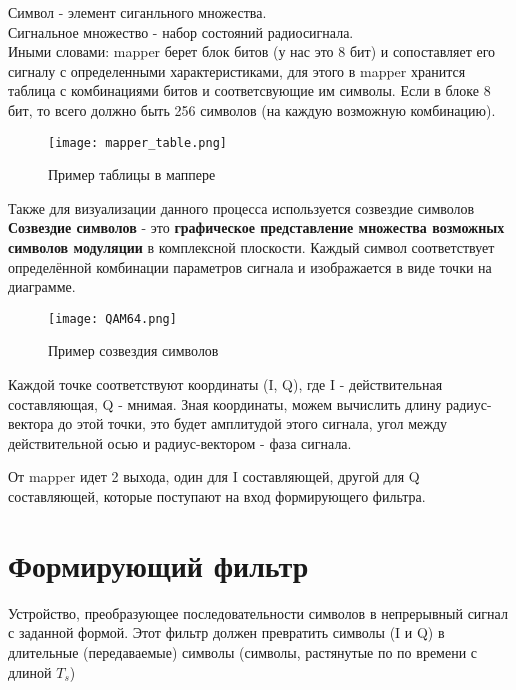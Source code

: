 \medskip

Символ - элемент сиганльного множества. \\

Сигнальное множество - набор состояний радиосигнала. \\

Иными словами: mapper берет блок битов (у нас это 8 бит) и сопоставляет его сигналу с определенными характеристиками, для 
этого в mapper хранится таблица с комбинациями битов и соответсвующие им символы. Если в блоке
8 бит, то всего должно быть 256 символов (на каждую возможную комбинацию). \\

\begin{figure}[H]
    \centering
    \texttt{[image: mapper\_table.png]}
    \caption{Пример таблицы в маппере}
\end{figure}

Также для визуализации данного процесса используется созвездие символов \\

\textbf{Созвездие символов} - это \textbf{графическое представление множества возможных символов модуляции} в комплексной плоскости.  
Каждый символ соответствует определённой комбинации параметров сигнала и изображается в виде точки на диаграмме.  

\begin{figure}[H]
    \centering
    \texttt{[image: QAM64.png]}
    \caption{Пример созвездия символов}
\end{figure}

Каждой точке соответствуют координаты (I, Q), где I - действительная составляющая, Q - мнимая. Зная координаты, можем вычислить
длину радиус-вектора до этой точки, это будет амплитудой этого сигнала, угол между действительной осью и радиус-вектором - фаза
сигнала.

От mapper идет 2 выхода, один для I составляющей, другой для Q составляющей, которые поступают на вход формирующего фильтра.

\section*{Формирующий фильтр}

Устройство, преобразующее последовательности символов в непрерывный сигнал с заданной формой. Этот фильтр должен превратить символы (I и Q) в длительные (передаваемые) символы (символы, растянутые по по времени с длиной $T_s$)

